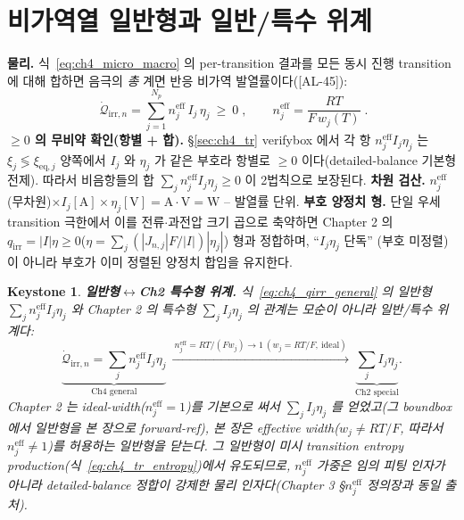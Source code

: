 \documentclass[11pt,a4paper]{article}
\newtheorem*{keybox}{Keystone}
\newcommand{\eff}{\mathrm{eff}}
\newcommand{\eq}{\mathrm{eq}}
\newcommand{\irr}{\mathrm{irr}}
\newcommand{\AL}[1]{\textsf{[AL-#1]}}
\begin{document}
\section{비가역열 일반형과 일반/특수 위계}\label{sec:ch4_general}
\textbf{물리.} 식~\eqref{eq:ch4_micro_macro} 의 per-transition 결과를 모든 동시 진행 transition 에 대해 합하면
음극의 \emph{총} 계면 반응 비가역 발열률이다(\AL{45}):
\begin{equation}
\boxed{\;\dot{\mathcal Q}_{\irr,n}=\sum_{j=1}^{N_p} n_j^{\eff}\,I_j\,\eta_j\ \ge\ 0\;,\qquad
n_j^{\eff}=\frac{RT}{F\,w_j(T)}\;.}
\label{eq:ch4_qirr_general}
\end{equation}
\textbf{$\ge0$ 의 무비약 확인(항별 + 합).} \S\ref{sec:ch4_tr} verifybox 에서 각 항 $n_j^{\eff}I_j\eta_j$ 는
$\xi_j\lessgtr\xi_{\eq,j}$ 양쪽에서 $I_j$ 와 $\eta_j$ 가 같은 부호라 항별로 $\ge0$ 이다(detailed-balance
기본형 전제). 따라서 비음항들의 합 $\sum_j n_j^{\eff}I_j\eta_j\ge0$ 이 2법칙으로 보장된다. \textbf{차원 검산.}
$n_j^{\eff}$(무차원)$\times I_j[\mathrm A]\times\eta_j[\mathrm V]=\mathrm{A\cdot V}=\mathrm W$ -- 발열률 단위.
\textbf{부호 양정치 형.} 단일 우세 transition 극한에서 이를 전류$\cdot$과전압 크기 곱으로 축약하면
Chapter 2 의 $q_\irr=|I|\eta\ge0$($\eta=\sum_j(|J_{n,j}|F/|I|)|\eta_j|$) 형과 정합하며, ``$I_j\eta_j$ 단독''
(부호 미정렬)이 아니라 부호가 이미 정렬된 양정치 합임을 유지한다.

\begin{keybox}
\textbf{일반형$\leftrightarrow$Ch2 특수형 위계.} 식~\eqref{eq:ch4_qirr_general} 의 \emph{일반형}
$\sum_j n_j^{\eff}I_j\eta_j$ 와 Chapter 2 의 \emph{특수형} $\sum_j I_j\eta_j$ 의 관계는 \emph{모순이 아니라
일반/특수 위계}다:
\begin{equation}
\underbrace{\dot{\mathcal Q}_{\irr,n}=\sum_j n_j^{\eff}I_j\eta_j}_{\text{Ch4 general}}
\ \xrightarrow{\ n_j^{\eff}=RT/(Fw_j)\to1\ (w_j=RT/F,\ \text{ideal})\ }\
\underbrace{\sum_j I_j\eta_j}_{\text{Ch2 special}}.
\label{eq:ch4_hierarchy}
\end{equation}
Chapter 2 는 ideal-width($n_j^{\eff}=1$)를 기본으로 써서 $\sum_j I_j\eta_j$ 를 얻었고(그 boundbox 에서 일반형을
본 장으로 forward-ref), 본 장은 effective width($w_j\ne RT/F$, 따라서 $n_j^{\eff}\ne1$)를 허용하는 일반형을
닫는다. 그 일반형이 미시 transition entropy production(식~\eqref{eq:ch4_tr_entropy})에서 유도되므로, $n_j^{\eff}$
가중은 임의 피팅 인자가 아니라 \emph{detailed-balance 정합이 강제한} 물리 인자다(Chapter 3 \S$n_j^{\eff}$
정의장과 동일 출처).
\end{keybox}
\end{document}
